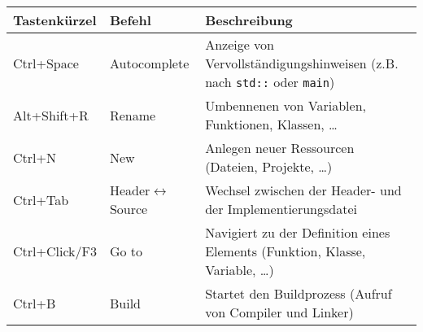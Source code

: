 \begin{tabular}{l|l|p{11.5cm}}
    \toprule
    \textbf{Tastenkürzel} & \textbf{Befehl} & \textbf{Beschreibung}\\
    \midrule
	Ctrl+Space & Autocomplete &
	Anzeige von Vervollständigungshinweisen (z.B. nach \texttt{std::} oder \texttt{main})
	\\
	Alt+Shift+R & Rename &
	Umbennenen von Variablen, Funktionen, Klassen, \dots
	\\
	Ctrl+N & New &
	Anlegen neuer Ressourcen (Dateien, Projekte, \dots)
	\\
	Ctrl+Tab & Header$\leftrightarrow$Source &
	Wechsel zwischen der Header- und der Implementierungsdatei
	\\
	Ctrl+Click/F3 & Go to &
	Navigiert zu der Definition eines Elements (Funktion, Klasse, Variable, \dots)
	\\
	Ctrl+B & Build &
	Startet den Buildprozess (Aufruf von Compiler und Linker)
    \\\bottomrule
\end{tabular}

